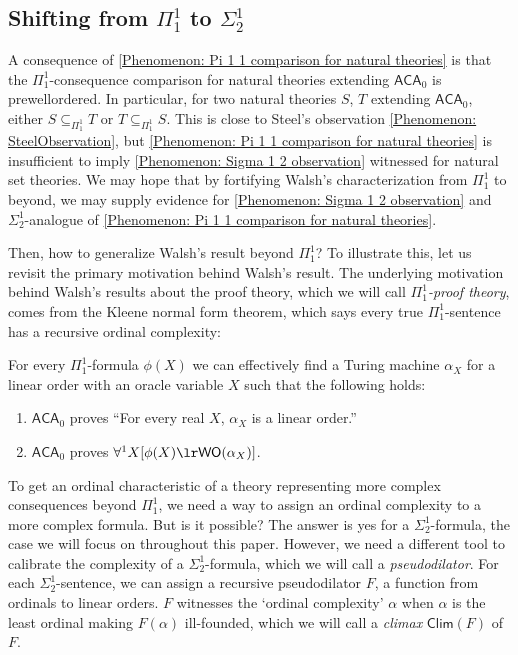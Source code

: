 \documentclass{mhkr}
\newcommand{\added}[1]{#1}
\newcommand{\WO}{\mathsf{WO}}
\newcommand{\Clim}{\mathsf{Clim}}
\newcommand{\ACA}{\mathsf{ACA}}
\begin{document}
\subsection{Shifting from \texorpdfstring{$\Pi^1_1$}{Pi 1 1} to \texorpdfstring{$\Sigma^1_2$}{Sigma 1 2}}
\added{A consequence of \autoref{Phenomenon: Pi 1 1 comparison for natural theories} is that the $\Pi^1_1$-consequence comparison for natural theories extending $\ACA_0$ is prewellordered. In particular, for two natural theories $S$, $T$ extending $\ACA_0$, either $S \subseteq_{\Pi^1_1} T$ or $T\subseteq_{\Pi^1_1} S$. This is close to Steel's observation \autoref{Phenomenon: SteelObservation}, but \autoref{Phenomenon: Pi 1 1 comparison for natural theories} is insufficient to imply \autoref{Phenomenon: Sigma 1 2 observation} witnessed for natural set theories. We may hope that by fortifying Walsh's characterization from $\Pi^1_1$ to beyond, we may supply evidence for \autoref{Phenomenon: Sigma 1 2 observation} and $\Sigma^1_2$-analogue of \autoref{Phenomenon: Pi 1 1 comparison for natural theories}.}

Then, how to generalize Walsh's result beyond $\Pi^1_1$? To \added{illustrate} this, let us \added{revisit} the \added{primary} motivation behind Walsh's result. 
The underlying motivation behind Walsh's results about the proof theory, which we will call \emph{$\Pi^1_1$-proof theory}, comes from the Kleene normal form theorem, which says every true $\Pi^1_1$-sentence has a recursive ordinal complexity:
\begin{theorem} \label{Theorem: Kleene normal form}
    \pushQED{\qed}
    \added{For every $\Pi^1_1$-formula $\phi(X)$ we can effectively find a Turing machine $\alpha_X$ for a linear order with an oracle variable $X$ such that the following holds:
    \begin{enumerate}
        \item $\ACA_0$ proves ``For every real $X$, $\alpha_X$ is a linear order.''
        \item $\ACA_0$ proves $\forall^1 X [\phi(X)\lr \WO(\alpha_X)]$. \qedhere
    \end{enumerate}
    }
\end{theorem}

To get an ordinal characteristic of a theory representing more complex consequences beyond $\Pi^1_1$, we need a way to assign an ordinal complexity to a more complex formula. But is it possible? The answer is yes for a $\Sigma^1_2$-formula, the case we will focus on throughout this paper. However, we need a different tool to calibrate the complexity of a $\Sigma^1_2$-formula, \added{which} we will call a \emph{pseudodilator}. For each $\Sigma^1_2$-sentence, we can assign a recursive pseudodilator $F$, a function from ordinals to linear orders. $F$ witnesses the `ordinal complexity' $\alpha$ when $\alpha$ is the least ordinal making $F(\alpha)$ ill-founded, which we will call a \emph{climax} $\Clim(F)$ of $F$. 
\end{document}
